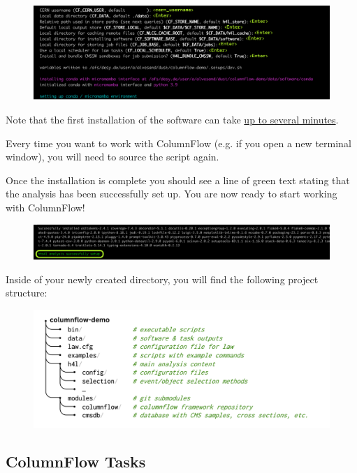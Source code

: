 \begin{figure}[!h]
    \centering
    \includegraphics[scale=0.62]{images/setup.png}
\end{figure}

Note that the first installation of the software can take \underline{up to several minutes}. 

Every time you want to work with ColumnFlow (e.g. if you open a new terminal window), you will need to source the  script again.

Once the installation is complete you should see a line of green text stating that the analysis has been successfully set up. You are now ready to start working with ColumnFlow! 

\begin{figure}[!h]
    \centering
    \includegraphics[scale=0.62]{images/setup2.png}
\end{figure}

Inside of your newly created  directory, you will find the following project structure:
\begin{figure}[!h]
    \centering
    \includegraphics[scale=0.62]{images/CF_demo.png}
\end{figure}

\subsection{ColumnFlow Tasks}

